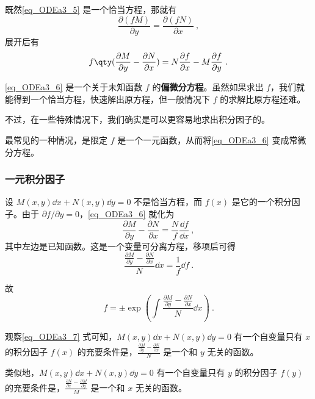 既然\autoref{eq_ODEa3_5} 是一个恰当方程，那就有
\begin{equation}
\frac{\partial (fM)}{\partial y}=\frac{\partial (fN)}{\partial x}~,
\end{equation}
展开后有
\begin{equation}\label{eq_ODEa3_6}
f\qty(\frac{\partial M}{\partial y}-\frac{\partial N}{\partial x})=N\frac{\partial f}{\partial x}-M\frac{\partial f}{\partial y}~.
\end{equation}

\autoref{eq_ODEa3_6} 是一个关于未知函数 $f$ 的\textbf{偏微分方程}。虽然如果求出 $f$，我们就能得到一个恰当方程，快速解出原方程，但一般情况下 $f$ 的求解比原方程还难。

不过，在一些特殊情况下，我们确实是可以更容易地求出积分因子的。

最常见的一种情况，是限定 $f$ 是一个一元函数，从而将\autoref{eq_ODEa3_6} 变成常微分方程。

\subsubsection{一元积分因子}

设 $M(x, y)\dd x+N(x, y)\dd y=0$ 不是恰当方程，而 $f(x)$ 是它的一个积分因子。由于 $\partial f/\partial y=0$，\autoref{eq_ODEa3_6} 就化为
\begin{equation}
\frac{\partial M}{\partial y}-\frac{\partial N}{\partial x}=\frac{N}{f}\frac{\dd f}{\dd x}~,
\end{equation}
其中左边是已知函数。这是一个变量可分离方程，移项后可得
\begin{equation}
\frac{\frac{\partial M}{\partial y}-\frac{\partial N}{\partial x}}{N}\dd x=\frac{1}{f}\dd f~.
\end{equation}

故
\begin{equation}\label{eq_ODEa3_7}
f=\pm \exp(\int \frac{\frac{\partial M}{\partial y}-\frac{\partial N}{\partial x}}{N}\dd x)~.
\end{equation}

观察\autoref{eq_ODEa3_7} 式可知，$M(x, y)\dd x+N(x, y)\dd y=0$ 有一个自变量只有 $x$ 的积分因子 $f(x)$ 的充要条件是，$\frac{\frac{\partial M}{\partial y}-\frac{\partial N}{\partial x}}{N}$ 是一个和 $y$ 无关的函数。

类似地，$M(x, y)\dd x+N(x, y)\dd y=0$ 有一个自变量只有 $y$ 的积分因子 $f(y)$ 的充要条件是，$\frac{\frac{\partial N}{\partial x}-\frac{\partial M}{\partial y}}{M}$ 是一个和 $x$ 无关的函数。

